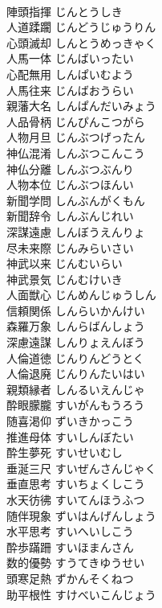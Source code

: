 \documentclass[8pt]{extreport}
\begin{document}
\begin{CJK}{UTF8}{min}
\\	陣頭指揮	じんとうしき	
\\	人道蹂躙	じんどうじゅうりん	
\\	心頭滅却	しんとうめっきゃく	
\\	人馬一体	じんばいったい	
\\	心配無用	しんぱいむよう	
\\	人馬往来	じんばおうらい	
\\	親藩大名	しんぱんだいみょう	
\\	人品骨柄	じんぴんこつがら	
\\	人物月旦	じんぶつげったん	
\\	神仏混淆	しんぶつこんこう	
\\	神仏分離	しんぶつぶんり	
\\	人物本位	じんぶつほんい	
\\	新聞学問	しんぶんがくもん	
\\	新聞辞令	しんぶんじれい	
\\	深謀遠慮	しんぼうえんりょ	
\\	尽未来際	じんみらいさい	
\\	神武以来	じんむいらい	
\\	神武景気	じんむけいき	
\\	人面獣心	じんめんじゅうしん	
\\	信頼関係	しんらいかんけい	
\\	森羅万象	しんらばんしょう	
\\	深慮遠謀	しんりょえんぼう	
\\	人倫道徳	じんりんどうとく	
\\	人倫退廃	じんりんたいはい	
\\	親類縁者	しんるいえんじゃ	
\\	酔眼朦朧	すいがんもうろう	
\\	随喜渇仰	ずいきかっこう	
\\	推進母体	すいしんぼたい	
\\	酔生夢死	すいせいむし	
\\	垂涎三尺	すいぜんさんじゃく	
\\	垂直思考	すいちょくしこう	
\\	水天彷彿	すいてんほうふつ	
\\	随伴現象	ずいはんげんしょう	
\\	水平思考	すいへいしこう	
\\	酔歩蹣跚	すいほまんさん	
\\	数的優勢	すうてきゆうせい	
\\	頭寒足熱	ずかんそくねつ	
\\	助平根性	すけべいこんじょう	

\end{CJK}
\end{document}
